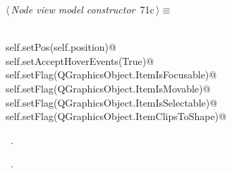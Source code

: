 \documentclass[
    a4paper,      %
    10pt,         %
    openright,    %
    notitlepage,  %
    parskip=half, %
]{scrreprt}       %
\theoremstyle{definition}                    %
\begin{document}
\begin{flushleft} \small
\begin{minipage}{\linewidth}\label{scrap124}\raggedright\small
{} $\langle\,${\itshape Node view model constructor}\nobreak\ {\footnotesize {71c}}$\,\rangle\equiv$
\vspace{-1ex}
\begin{list}{}{} \item
\mbox{}\lstinline@@\\
\mbox{}\lstinline@    self.setPos(self.position)@\\
\mbox{}\lstinline@    self.setAcceptHoverEvents(True)@\\
\mbox{}\lstinline@    self.setFlag(QGraphicsObject.ItemIsFocusable)@\\
\mbox{}\lstinline@    self.setFlag(QGraphicsObject.ItemIsMovable)@\\
\mbox{}\lstinline@    self.setFlag(QGraphicsObject.ItemIsSelectable)@\\
\mbox{}\lstinline@    self.setFlag(QGraphicsObject.ItemClipsToShape)@\\
\mbox{}\lstinline@@{\NWsep}
\end{list}
\vspace{-1.5ex}
\footnotesize
\begin{list}{}{\setlength{\itemsep}{-\parsep}\setlength{\itemindent}{-\leftmargin}}
\item \NWtxtMacroDefBy\ .
\item \NWtxtMacroRefIn\ .

\item{}
\end{list}
\end{minipage}\vspace{4ex}
\end{flushleft}
\end{document}
